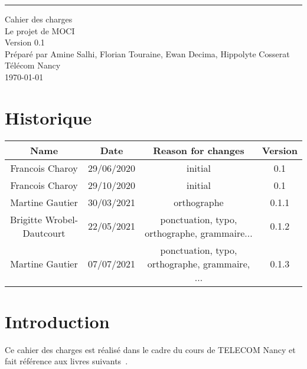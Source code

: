 \documentclass{scrreprt}
\date{}
\def\myversion{0.1 }
\begin{document}
\renewcommand*{\glsclearpage}{}
\begin{center}
    \rule{16cm}{5pt}\vskip1cm
    \begin{bfseries}
        \Huge{Cahier des charges}\\
        \vspace{1.9cm}
        Le projet de MOCI\\
        \vspace{1.9cm}
        \LARGE{Version \myversion}\\
        \vspace{1.9cm}
        Préparé par Amine Salhi, Florian Touraine, Ewan Decima, Hippolyte Cosserat\\
        \vspace{1.9cm}
        Télécom Nancy\\
        \vspace{1.9cm}
        \today\\
    \end{bfseries}
\end{center}

\tableofcontents

\chapter*{Historique}

\begin{center}
    \begin{tabular}{|c|c|c|c|}
        \hline
	    Name & Date & Reason for changes & Version\\
        \hline
	    Francois Charoy & 29/06/2020 & initial & 0.1\\
        \hline
	    Francois Charoy & 29/10/2020 & initial & 0.1\\
        \hline
	    Martine Gautier & 30/03/2021 & orthographe & 0.1.1\\
        \hline
        Brigitte Wrobel-Dautcourt & 22/05/2021 & ponctuation, typo, orthographe, grammaire... & 0.1.2\\
        \hline
        Martine Gautier & 07/07/2021 & ponctuation, typo, orthographe, grammaire, ... & 0.1.3\\
        \hline
    \end{tabular}
\end{center}

\chapter{Introduction}
Ce cahier des charges est réalisé dans le cadre du cours de TELECOM Nancy  et fait référence aux livres suivants~\cite{Sommerville:2010:SE:1841764,Pohl:2010:REF:1869735,Rumbaugh:2004:UML:993859}.
\end{document}
